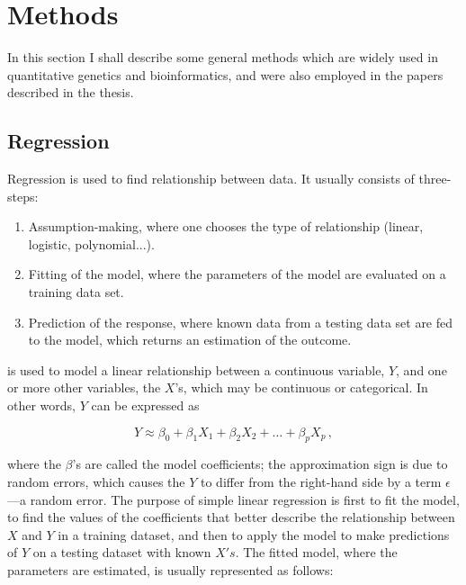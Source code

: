 \documentclass[../main.tex]{subfiles}
\begin{document}
\chapter{Methods}

In this section I shall describe some general methods which are widely 
used in quantitative genetics and bioinformatics, and were also employed 
in the papers described in the thesis.

\section{Regression}

Regression is used to find relationship between data. It usually 
consists of three-steps:

\begin{enumerate}
	\item Assumption-making, where one chooses the type of relationship 
(\eg linear, logistic, polynomial...).
	\item Fitting of the model, where the parameters of the model are 
evaluated on a training data set.
	\item Prediction of the response, where known data from a testing 
data set are fed to the model, which returns an estimation of the 
outcome.
\end{enumerate}

 is used to model a linear 
relationship between a continuous variable, $Y$, and one or more other 
variables, the $X$'s, which may be continuous or categorical. In other 
words, $Y$ can be expressed as

\begin{equation}
	Y \approx \beta_0 + \beta_1X_1 + \beta_2X_2 + \ldots + \beta_pX_p\,,
\end{equation}

where the $\beta$'s are called the model coefficients; the approximation 
sign is due to random errors, which causes the $Y$ to differ from the 
right-hand side by a term $\epsilon$ ---a random error. The purpose of 
simple linear regression is first to fit the model, \ie to find the 
values of the coefficients that better describe the relationship between 
$X$ and $Y$ in a training dataset, and then to apply the model to make 
predictions of $Y$ on a testing dataset with known $X's$. The fitted 
model, where the parameters are estimated, is usually represented as 
follows:
\end{document}
